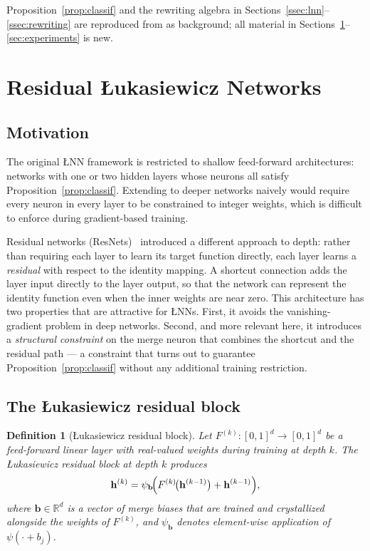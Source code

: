 \documentclass[10pt,a4paper,twoside]{article}
\newtheorem{definition}[theorem]{Definition}
\newcommand{\LNN}{\L{}NN}
\begin{document}
Proposition~\ref{prop:classif} and the rewriting algebra in
Sections~\ref{ssec:lnn}--\ref{ssec:rewriting} are reproduced from
\cite{leandro2009} as background; all material in
Sections~\ref{sec:residual}--\ref{sec:experiments} is new.

\section{Residual \L{}ukasiewicz Networks}
\label{sec:residual}

\subsection{Motivation}
\label{ssec:res_motiv}

The original \LNN{} framework is restricted to shallow feed-forward
architectures: networks with one or two hidden layers whose neurons all satisfy
Proposition~\ref{prop:classif}.
Extending to deeper networks naively would require every neuron in every layer
to be constrained to integer weights, which is difficult to enforce during
gradient-based training.

Residual networks (ResNets)~\cite{he2016} introduced a different approach to
depth: rather than requiring each layer to learn its target function directly,
each layer learns a \emph{residual} with respect to the identity mapping.
A shortcut connection adds the layer input directly to the layer output,
so that the network can represent the identity function even when the inner
weights are near zero.
This architecture has two properties that are attractive for \LNN{}s.
First, it avoids the vanishing-gradient problem in deep networks.
Second, and more relevant here, it introduces a \emph{structural constraint}
on the merge neuron that combines the shortcut and the residual path
--- a constraint that turns out to guarantee Proposition~\ref{prop:classif}
without any additional training restriction.

\subsection{The \L{}ukasiewicz residual block}
\label{ssec:res_block}

\begin{definition}[\L{}ukasiewicz residual block]
\label{def:resblock}
Let $F^{(k)}\colon [0,1]^d \to [0,1]^d$ be a feed-forward linear layer
with real-valued weights during training at depth $k$.
The \emph{\L{}ukasiewicz residual block} at depth $k$ produces
\begin{equation}
  \mathbf{h}^{(k)} = \psi_{\mathbf{b}}\!\Bigl(
    F^{(k)}\!\bigl(\mathbf{h}^{(k-1)}\bigr)
    + \mathbf{h}^{(k-1)}
  \Bigr),
  \label{eq:resblock}
\end{equation}
where $\mathbf{b} \in \mathbb{R}^d$ is a vector of \emph{merge biases} that
are trained and crystallized alongside the weights of $F^{(k)}$, and
$\psi_{\mathbf{b}}$ denotes element-wise application of $\psi(\cdot + b_j)$.
\end{definition}
\end{document}
